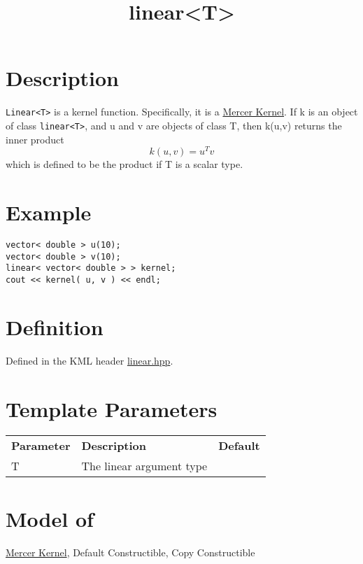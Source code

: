 \documentclass{article}
\begin{document}
\title{linear<T>}
\maketitle

\section*{Description}

\texttt{Linear<T>} is a kernel function. Specifically, it is a \href{research/kml/documentation/mercer_kernel.html}{Mercer Kernel}.
 If k is an object of class \texttt{linear<T>}, and u and v are objects of class T, then k(u,v) returns the inner product 
%
$$k(u,v) = u^T v $$
%
which is defined to be the product if T is a scalar type. 


\section*{Example}

\highlightcpp{}
\begin{verbatim}
vector< double > u(10);
vector< double > v(10);
linear< vector< double > > kernel;
cout << kernel( u, v ) << endl;
\end{verbatim}


\section*{Definition}

Defined in the KML header \href{linear.hpp}{linear.hpp}.


\section*{Template Parameters}

\begin{tabular}{lll}
\textbf{Parameter} & \textbf{Description} & \textbf{Default} \\ 
T & The linear argument type \\ 
\end{tabular}


\section*{Model of}

\href{research/kml/documentation/mercer_kernel.html}{Mercer Kernel}, 
Default Constructible, Copy Constructible
\end{document}
